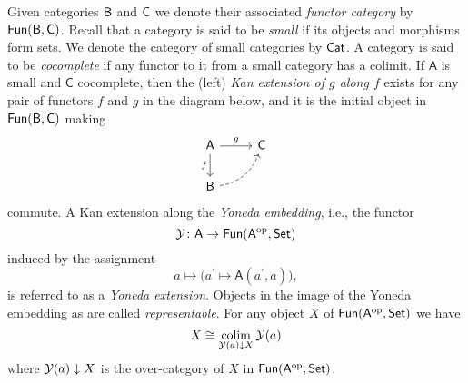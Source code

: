 Given categories $\mathsf{B}$ and $\mathsf{C}$ we denote their associated \textit{functor category} by $\mathsf{Fun}(\mathsf{B}, \mathsf{C})$.
%
Recall that a category is said to be \textit{small} if its objects and morphisms form sets.
We denote the category of small categories by $\mathsf{Cat}$.
A category is said to be \textit{cocomplete} if any functor to it from a small category has a colimit.
If $\mathsf{A}$ is small and $\mathsf{C}$ cocomplete, then the (left) \textit{Kan extension of $g$ along $f$} exists for any pair of functors $f$ and $g$ in the diagram below, and it is the initial object in $\mathsf{Fun}(\mathsf{B}, \mathsf{C})$ making
\begin{equation*}
\begin{tikzcd}[column sep=normal, row sep=normal]
\mathsf{A} \arrow[d, "f"'] \arrow[r, "g"] & \mathsf{C} \\
\sB \arrow[dashed, ur, bend right] & \quad
\end{tikzcd}
\end{equation*}
commute.
A Kan extension along the \textit{Yoneda embedding}, i.e., the functor
\[
\operatorname{\mathcal{Y}} \colon \mathsf{A} \to \mathsf{Fun}(\mathsf{A}^{\mathrm{op}}, \mathsf{Set})
\]
induced by the assignment
\[
a \mapsto \big( a^\prime \mapsto \mathsf{A}(a^\prime, a) \big),
\]
is referred to as a \textit{Yoneda extension}.
Objects in the image of the Yoneda embedding as are called \textit{representable}.
For any object $X$ of $\mathsf{Fun}(\mathsf{A}^{\mathrm{op}}, \mathsf{Set})$ we have
\[
X \cong \operatorname*{colim}_{\operatorname{\mathcal{Y}}(a) \downarrow X} \operatorname{\mathcal{Y}}(a)
\]
where ${\operatorname{\mathcal{Y}}(a) \downarrow X}$ is the over-category of $X$ in $\mathsf{Fun}(\mathsf{A}^{\mathrm{op}}, \mathsf{Set})$.

